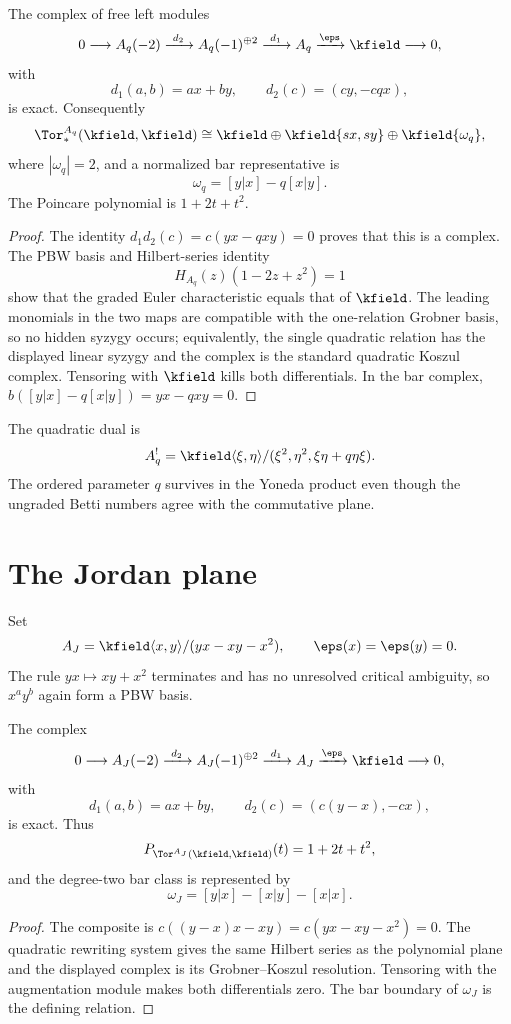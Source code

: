 \begin{theorem}\label{thm:qplane}
The complex of free left modules
\[
 0\longrightarrow A_q(-2)
 \xrightarrow{\ d_2\ }
 A_q(-1)^{\oplus2}
 \xrightarrow{\ d_1\ }
 A_q\xrightarrow{\eps}\kfield\longrightarrow0,
\]
with
\[
 d_1(a,b)=ax+by,
 \qquad
 d_2(c)=(cy,-cq x),
\]
is exact.  Consequently
\[
 \Tor_*^{A_q}(\kfield,\kfield)
 \cong \kfield\oplus \kfield\{sx,sy\}
 \oplus\kfield\{\omega_q\},
\]
where \(|\omega_q|=2\), and a normalized bar representative is
\[
 \omega_q=[y|x]-q[x|y].
\]
The Poincare polynomial is \(1+2t+t^2\).
\end{theorem}
\begin{proof}
The identity \(d_1d_2(c)=c(yx-qxy)=0\) proves that this is a complex.  The PBW basis and Hilbert-series identity
\[
 H_{A_q}(z)(1-2z+z^2)=1
\]
show that the graded Euler characteristic equals that of \(\kfield\).  The leading monomials in the two maps are compatible with the one-relation Grobner basis, so no hidden syzygy occurs; equivalently, the single quadratic relation has the displayed linear syzygy and the complex is the standard quadratic Koszul complex.  Tensoring with \(\kfield\) kills both differentials.  In the bar complex,
\(
 b([y|x]-q[x|y])=yx-qxy=0.
\)
\end{proof}

The quadratic dual is
\[
 A_q^!=\kfield\langle\xi,\eta\rangle/
 (\xi^2,\eta^2,\xi\eta+q\eta\xi).
\]
The ordered parameter \(q\) survives in the Yoneda product even though the ungraded Betti numbers agree with the commutative plane.

\section{The Jordan plane}
Set
\[
 A_J=\kfield\langle x,y\rangle/(yx-xy-x^2),
 \qquad \eps(x)=\eps(y)=0.
\]
The rule \(yx\mapsto xy+x^2\) terminates and has no unresolved critical ambiguity, so \(x^ay^b\) again form a PBW basis.

\begin{theorem}\label{thm:jordan}
The complex
\[
 0\longrightarrow A_J(-2)
 \xrightarrow{\ d_2\ }
 A_J(-1)^{\oplus2}
 \xrightarrow{\ d_1\ }
 A_J\xrightarrow{\eps}\kfield\longrightarrow0,
\]
with
\[
 d_1(a,b)=ax+by,
 \qquad
 d_2(c)=(c(y-x),-cx),
\]
is exact.  Thus
\[
 P_{\Tor^{A_J}(\kfield,\kfield)}(t)=1+2t+t^2,
\]
and the degree-two bar class is represented by
\[
 \omega_J=[y|x]-[x|y]-[x|x].
\]
\end{theorem}
\begin{proof}
The composite is \(c((y-x)x-xy)=c(yx-xy-x^2)=0\).  The quadratic rewriting system gives the same Hilbert series as the polynomial plane and the displayed complex is its Grobner--Koszul resolution.  Tensoring with the augmentation module makes both differentials zero.  The bar boundary of \(\omega_J\) is the defining relation.
\end{proof}

